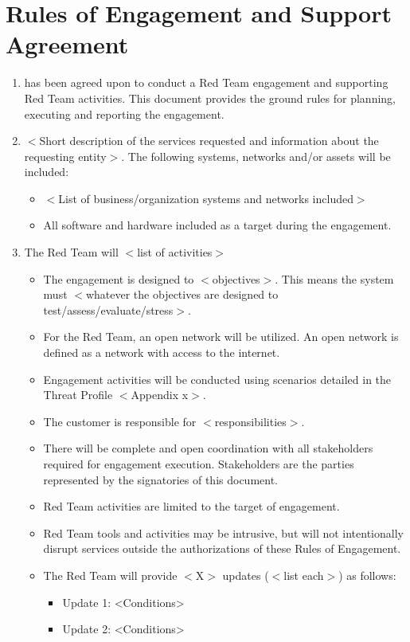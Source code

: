 \documentclass[12pt,letterpaper]{article}
\begin{document}
\section{Rules of Engagement and Support Agreement}
\begin{enumerate}[label=\alph*.]
    \item <RED TEAM COMPANY> has been agreed upon to conduct a Red Team engagement and supporting Red Team activities. This document provides the ground rules for planning, executing and reporting the engagement.
    
    \item $<$Short description of the services requested and information about the requesting entity$>$. The following systems, networks and/or assets will be included:
    \begin{itemize}
        \item $<$List of business/organization systems and networks included$>$
        \item All software and hardware included as a target during the engagement.
    \end{itemize}
    
    \item The Red Team will $<$list of activities$>$
    \begin{itemize}
        \item The engagement is designed to $<$objectives$>$. This means the system must $<$whatever the objectives are designed to test/assess/evaluate/stress$>$.
        \item For the Red Team, an open network will be utilized. An open network is defined as a network with access to the internet.
        \item Engagement activities will be conducted using scenarios detailed in the Threat Profile $<$Appendix x$>$.
        \item The customer is responsible for $<$responsibilities$>$.
        \item There will be complete and open coordination with all stakeholders required for engagement execution. Stakeholders are the parties represented by the signatories of this document.
        \item Red Team activities are limited to the target of engagement.
        \item Red Team tools and activities may be intrusive, but will not intentionally disrupt services outside the authorizations of these Rules of Engagement.
        \item The Red Team will provide $<$X$>$ updates ($<$list each$>$) as follows:
        \begin{itemize}
            \item Update 1: <Conditions>
            \item Update 2: <Conditions>
        \end{itemize}
    \end{itemize}
    

\end{enumerate}
\end{document}
